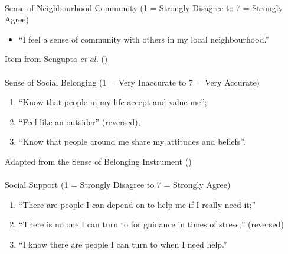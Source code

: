 \documentclass[
  single column]{article}
\makeatletter
\let\oldparagraph\paragraph
\renewcommand{\paragraph}{
    \@ifstar
      \xxxParagraphStar
      \xxxParagraphNoStar
  }
\newcommand{\xxxParagraphStar}[1]{\oldparagraph*{#1}\mbox{}}
\newcommand{\xxxParagraphNoStar}[1]{\oldparagraph{#1}\mbox{}}
\providecommand{\tightlist}{%
  \setlength{\itemsep}{0pt}\setlength{\parskip}{0pt}}\usepackage{longtable,booktabs,array}
\makeatother
\begin{document}
\paragraph{Sense of Neighbourhood Community (1 = Strongly Disagree to 7
= Strongly
Agree)}\label{sense-of-neighbourhood-community-1-strongly-disagree-to-7-strongly-agree}

\begin{itemize}
\tightlist
\item
  ``I feel a sense of community with others in my local neighbourhood.''
\end{itemize}

Item from Sengupta \emph{et al.} ()

\paragraph{Sense of Social Belonging (1 = Very Inaccurate to 7 = Very
Accurate)}\label{sense-of-social-belonging-1-very-inaccurate-to-7-very-accurate}

\begin{enumerate}
\def\labelenumi{(\arabic{enumi})}
\tightlist
\item
  ``Know that people in my life accept and value me'';
\item
  ``Feel like an outsider'' (reversed);
\item
  ``Know that people around me share my attitudes and beliefs''.
\end{enumerate}

Adapted from the Sense of Belonging Instrument
()

\paragraph{Social Support (1 = Strongly Disagree to 7 = Strongly
Agree)}\label{social-support-1-strongly-disagree-to-7-strongly-agree}

\begin{enumerate}
\def\labelenumi{(\arabic{enumi})}
\tightlist
\item
  ``There are people I can depend on to help me if I really need it;''
\item
  ``There is no one I can turn to for guidance in times of stress;''
  (reversed)
\item
  ``I know there are people I can turn to when I need help.''
\end{enumerate}
\end{document}
